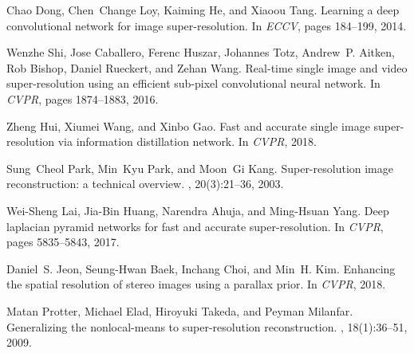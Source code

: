 \documentclass[10pt,twocolumn,letterpaper]{article}
\begin{document}
{\small
	
	
}


\begin{thebibliography}{10}
	
	Chao Dong, Chen~Change Loy, Kaiming He, and Xiaoou Tang.
	\newblock Learning a deep convolutional network for image super-resolution.
	\newblock In {\em ECCV}, pages 184--199, 2014.
	
	Wenzhe Shi, Jose Caballero, Ferenc Huszar, Johannes Totz, Andrew~P. Aitken, Rob
	Bishop, Daniel Rueckert, and Zehan Wang.
	\newblock Real-time single image and video super-resolution using an efficient
	sub-pixel convolutional neural network.
	\newblock In {\em CVPR}, pages 1874--1883, 2016.
	
	Zheng Hui, Xiumei Wang, and Xinbo Gao.
	\newblock Fast and accurate single image super-resolution via information
	distillation network.
	\newblock In {\em CVPR}, 2018.
	
	Sung~Cheol Park, Min~Kyu Park, and Moon~Gi Kang.
	\newblock Super-resolution image reconstruction: a technical overview.
	, 20(3):21--36, 2003.
	
	Wei{-}Sheng Lai, Jia{-}Bin Huang, Narendra Ahuja, and Ming{-}Hsuan Yang.
	\newblock Deep laplacian pyramid networks for fast and accurate
	super-resolution.
	\newblock In {\em CVPR}, pages 5835--5843, 2017.
	
	Daniel~S. Jeon, Seung-Hwan Baek, Inchang Choi, and Min~H. Kim.
	\newblock Enhancing the spatial resolution of stereo images using a parallax
	prior.
	\newblock In {\em CVPR}, 2018.
	
	Matan Protter, Michael Elad, Hiroyuki Takeda, and Peyman Milanfar.
	\newblock Generalizing the nonlocal-means to super-resolution reconstruction.
	, 18(1):36--51, 2009.
	

\end{thebibliography}
\end{document}
